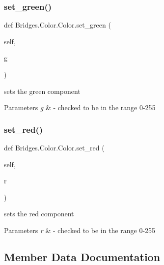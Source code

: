 \subsubsection{\texorpdfstring{set\+\_\+green()}{set\_green()}}
{\footnotesize\ttfamily def Bridges.\+Color.\+Color.\+set\+\_\+green (\begin{DoxyParamCaption}\item[{}]{self,  }\item[{}]{g }\end{DoxyParamCaption})}



sets the green component 


\begin{DoxyParams}{Parameters}
{\em g} & -\/ checked to be in the range 0-\/255 \\
\hline
\end{DoxyParams}
\mbox{\label{class_bridges_1_1_color_1_1_color_a8e2c7504d49723b525e08d7518a5dcfd}} 
\subsubsection{\texorpdfstring{set\+\_\+red()}{set\_red()}}
{\footnotesize\ttfamily def Bridges.\+Color.\+Color.\+set\+\_\+red (\begin{DoxyParamCaption}\item[{}]{self,  }\item[{}]{r }\end{DoxyParamCaption})}



sets the red component 


\begin{DoxyParams}{Parameters}
{\em r} & -\/ checked to be in the range 0-\/255 \\
\hline
\end{DoxyParams}


\subsection{Member Data Documentation}
\mbox{\label{class_bridges_1_1_color_1_1_color_abeff51ca1c74338e4678c2463f92e632}} 
